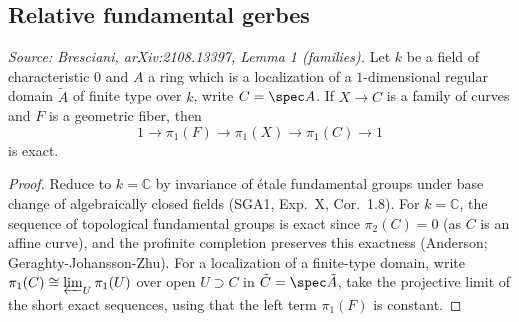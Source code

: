 \subsection{Relative fundamental gerbes}

\begin{lemma}[FamiliesExactSeq]
  \label{lem:families}
  \textit{Source: Bresciani, arXiv:2108.13397, Lemma 1 (families).}
  Let \(k\) be a field of characteristic \(0\) and \(A\) a ring which is a localization
  of a \(1\)-dimensional regular domain \(\tilde{A}\) of finite type over \(k\), write
  \(C = \spec A\). If \(X \to C\) is a family of curves and \(F\) is a geometric fiber,
  then
  \[1 \to \pi_1(F) \to \pi_1(X) \to \pi_1(C) \to 1\]
  is exact.
\end{lemma}

\begin{proof}
  Reduce to \(k = \mathbb{C}\) by invariance of étale fundamental groups under base
  change of algebraically closed fields (SGA1, Exp.\ X, Cor.\ 1.8). For \(k = \mathbb{C}\),
  the sequence of topological fundamental groups is exact since \(\pi_2(C) = 0\) (as
  \(C\) is an affine curve), and the profinite completion preserves this exactness
  (Anderson; Geraghty-Johansson-Zhu). For a localization of a finite-type domain,
  write \(\pi_1(C) \cong \varprojlim_U \pi_1(U)\) over open \(U \supset C\) in
  \(\tilde{C} = \spec \tilde{A}\), take the projective limit of the short exact
  sequences, using that the left term \(\pi_1(F)\) is constant.
\end{proof}

